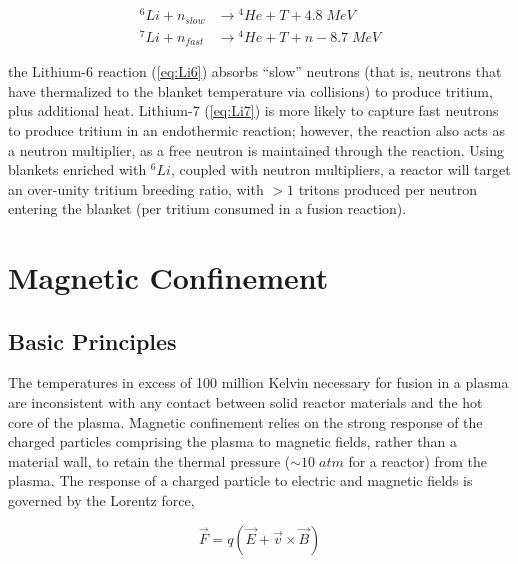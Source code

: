 \begin{align}
 {}^6\si{Li} + \si{n}_{slow} &\rightarrow {}^4\si{He} + \si{T} + 4.8 \;\si{MeV}\label{eq:Li6}\\
 {}^7\si{Li} + \si{n}_{fast} &\rightarrow {}^4\si{He} + \si{T} + \si{n} - 8.7 \;\si{MeV}\label{eq:Li7}
\end{align}

\noindent the Lithium-6 reaction (\cref{eq:Li6}) absorbs ``slow'' neutrons (that is, neutrons that have thermalized to the blanket temperature via collisions) to produce tritium, plus additional heat.  Lithium-7 (\cref{eq:Li7}) is more likely to capture fast neutrons to produce tritium in an endothermic reaction; however, the reaction also acts as a neutron multiplier, as a free neutron is maintained through the reaction.  Using blankets enriched with ${}^6\si{Li}$, coupled with neutron multipliers, a reactor will target an over-unity tritium breeding ratio, with $>1$ tritons produced per neutron entering the blanket (\ie per tritium consumed in a fusion reaction).\nicesectionending


\section{Magnetic Confinement}\label{sec:intro_magnetic}

\subsection{Basic Principles}\label{subsec:intro_basic}

The temperatures in excess of 100 million Kelvin necessary for fusion in a plasma are inconsistent with any contact between solid reactor materials and the hot core of the plasma.  Magnetic confinement relies on the strong response of the charged particles comprising the plasma to magnetic fields, rather than a material wall, to retain the thermal pressure ($\sim 10 \;\si{atm}$ for a reactor) from the plasma.  The response of a charged particle to electric and magnetic fields is governed by the Lorentz force,

\begin{equation}\label{eq:lorentz}
 \vec{F} = q\left(\vec{E} + \vec{v} \times \vec{B}\right)
\end{equation}

